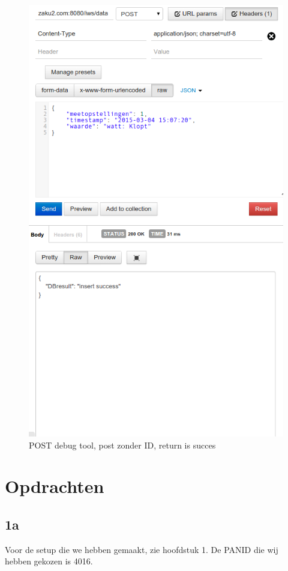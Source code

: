 \documentclass[12pt]{article}
\begin{document}
\begin{figure}
\begin{center}
\includegraphics[scale=.6]{Rest_test_3.png}
\caption{POST debug tool, post zonder ID, return is succes}
\label{fig:rest_test3}
\end{center}
\end{figure}
\clearpage
\section{Opdrachten}

\subsection*{1a}
Voor de setup die we hebben gemaakt, zie hoofdstuk 1. De PANID die wij hebben gekozen is 4016.
\end{document}
